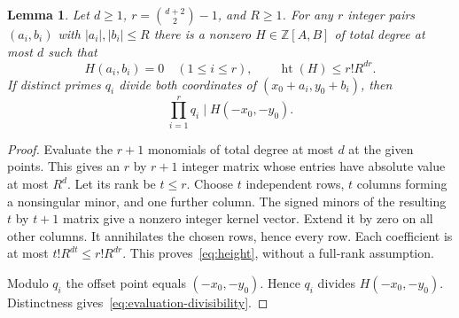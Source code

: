 \documentclass[11pt]{article}
\newtheorem{lemma}[theorem]{Lemma}
\theoremstyle{definition}
\theoremstyle{remark}
\newcommand{\ZZ}{\mathbb Z}
\newcommand{\htp}{\operatorname{ht}}
\begin{document}
\begin{lemma}\label{lem:interpolation}
Let $d\geq1$, $r=\binom{d+2}{2}-1$, and $R\geq1$.
For any $r$ integer pairs $(a_i,b_i)$ with $|a_i|,|b_i|\leq R$ there is
a nonzero $H\in\ZZ[A,B]$ of total degree at most $d$ such that
\begin{equation}\label{eq:height}
 H(a_i,b_i)=0\quad(1\leq i\leq r),\qquad
                         \htp(H)\leq r!R^{dr}.
\end{equation}
If distinct primes $q_i$ divide both coordinates of
$(x_0+a_i,y_0+b_i)$, then
\begin{equation}\label{eq:evaluation-divisibility}
                         \prod_{i=1}^r q_i\mid H(-x_0,-y_0).
\end{equation}
\end{lemma}
\begin{proof}
Evaluate the $r+1$ monomials of total degree at most $d$ at the given
points. This gives an $r$ by $r+1$ integer matrix whose entries have
absolute value at most $R^d$.
Let its rank be $t\leq r$. Choose $t$ independent rows, $t$ columns
forming a nonsingular minor, and one further column. The signed minors of
the resulting $t$ by $t+1$ matrix give a nonzero integer kernel vector.
Extend it by zero on all other columns. It annihilates the chosen rows,
hence every row. Each coefficient is at most $t!R^{dt}\leq r!R^{dr}$.
This proves~\eqref{eq:height}, without a full-rank assumption.

Modulo $q_i$ the offset point equals $(-x_0,-y_0)$. Hence $q_i$ divides
$H(-x_0,-y_0)$. Distinctness gives~\eqref{eq:evaluation-divisibility}.
\end{proof}
\end{document}
